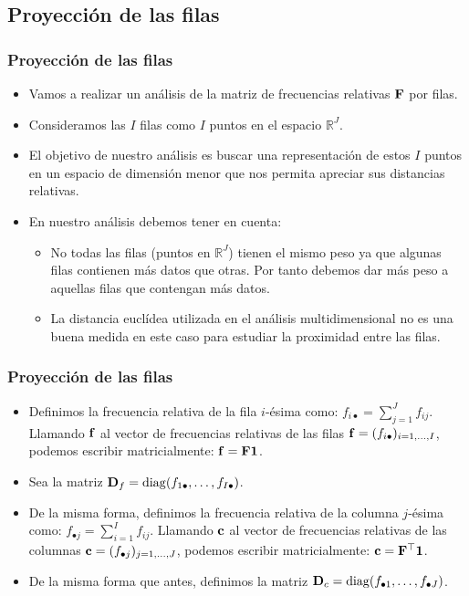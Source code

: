 \subsection{Proyección de las filas}
\begin{frame}
\frametitle{Proyección de las filas}
\begin{itemize}
\item<2->{Vamos a realizar un análisis de la matriz de frecuencias relativas $\mathbf{F}$ por filas.}
\item<3->{Consideramos las $I$ filas como $I$ puntos en el espacio $\mathbb{R}^J$.}
\item<4->{El objetivo de nuestro análisis es buscar una representación de estos $I$ puntos en un espacio de dimensión menor que nos permita apreciar sus distancias relativas.}
\item<5->{En nuestro análisis debemos tener en cuenta:
\begin{itemize}
\item<6->{No todas las filas (puntos en $\mathbb{R}^J$) tienen el mismo peso ya que algunas filas contienen más datos que otras. Por tanto debemos dar más peso a aquellas filas que contengan más datos.}
\item<7->{La distancia euclídea utilizada en el análisis multidimensional no es una buena medida en este caso para estudiar la proximidad entre las filas.}
\end{itemize}}
\end{itemize}
\end{frame}
\begin{frame}
\frametitle{Proyección de las filas}
\begin{itemize}
\item<2->{Definimos la frecuencia relativa de la fila $i$-ésima como: $f_{i\bullet}=\sum\limits_{j=1}^J f_{ij}$. Llamando $\mathbf{f}$ al vector de frecuencias relativas de las filas $\mathbf{f}=(f_{i\bullet})_{i=1,\ldots,I}$, podemos escribir matricialmente: $\mathbf{f}=\mathbf{F} \mathbf{1}$.}
\item<3->{Sea la matriz $\mathbf{D}_f ={\rm diag}(f_{1\bullet},\ldots,f_{I\bullet})$.}
\item<4->{De la misma forma, definimos  la frecuencia relativa de la columna $j$-ésima como: $f_{\bullet j}=\sum\limits_{i=1}^I f_{ij}$. Llamando $\mathbf{c}$ al vector de frecuencias relativas de las columnas $\mathbf{c}=(f_{\bullet j})_{j=1,\ldots,J}$, podemos escribir matricialmente: $\mathbf{c}=\mathbf{F}^\top \mathbf{1}$.}
\item<5->{De la misma forma que antes, definimos la matriz $\mathbf{D}_c ={\rm diag}(f_{\bullet 1},\ldots,f_{\bullet J})$.}
\end{itemize}
\end{frame}

